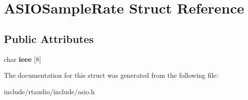 \hypertarget{struct_a_s_i_o_sample_rate}{}\section{A\+S\+I\+O\+Sample\+Rate Struct Reference}
\label{struct_a_s_i_o_sample_rate}
\subsection*{Public Attributes}
\begin{DoxyCompactItemize}
\item 
char {\bfseries ieee} \mbox{[}8\mbox{]}\hypertarget{struct_a_s_i_o_sample_rate_acd02c130a91fa97854391ee1ce47d098}{}\label{struct_a_s_i_o_sample_rate_acd02c130a91fa97854391ee1ce47d098}

\end{DoxyCompactItemize}


The documentation for this struct was generated from the following file\+:\begin{DoxyCompactItemize}
\item 
include/rtaudio/include/asio.\+h\end{DoxyCompactItemize}
